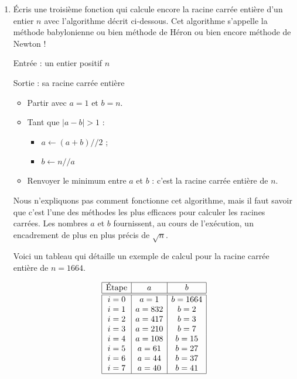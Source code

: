 \documentclass[11pt,class=report,crop=false]{standalone}
\begin{document}
\begin{activite}
\begin{enumerate}
  \item Écris une troisième fonction qui calcule encore la racine carrée entière d'un entier $n$ avec l'algorithme décrit ci-dessous. Cet algorithme s'appelle la méthode babylonienne ou bien méthode de Héron ou bien encore méthode de Newton !
  
    \begin{algorithme}
  Entrée : un entier positif $n$

  Sortie : sa racine carrée entière

  \begin{itemize}
    \item  Partir avec $a=1$ et $b=n$.
    
    \item  Tant que $|a-b| > 1$ :
    \begin{itemize} 
     \item $a \leftarrow (a+b)//2$ ;
     \item $b \leftarrow n // a$ 
    \end{itemize}          
         
    \item Renvoyer le minimum entre $a$ et $b$ : c'est la racine carrée entière de $n$.
  \end{itemize} 
           
 \end{algorithme}
 
 
  Nous n'expliquons pas comment fonctionne cet algorithme, mais il faut savoir que c'est l'une des méthodes les plus efficaces pour calculer les racines carrées. Les nombres $a$ et $b$ fournissent, au cours de l’exécution, un encadrement de plus en plus précis de $\sqrt{n}$. 
  
  Voici un tableau qui détaille un exemple de calcul pour la racine carrée entière de $n=1664$.

  \medskip
  
$$\begin{array}{|c|c|c|} 
\hline
\text{Étape} & a & b \\ \hline\hline
i = 0  &  a =  1    &  b =  1664 \\
i = 1  &  a =  832  &  b =  2 \\
i = 2  &  a =  417  &  b =  3 \\
i = 3  &  a =  210  &  b =  7 \\
i = 4  &  a =  108  &  b =  15 \\
i = 5  &  a =  61   &  b =  27 \\
i = 6  &  a =  44   &  b =  37 \\
i = 7  &  a =  40   &  b =  41 \\ \hline
\end{array}$$


\end{enumerate}
\end{activite}
\end{document}

